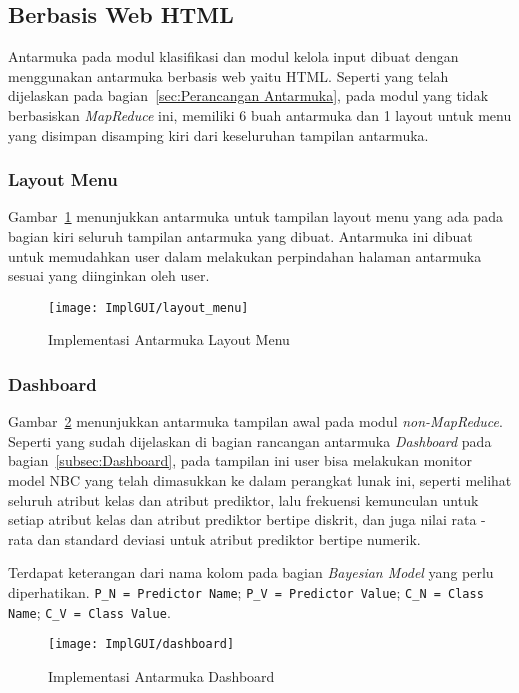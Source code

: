 \subsection{Berbasis Web HTML}
Antarmuka pada modul klasifikasi dan modul kelola input dibuat dengan menggunakan antarmuka berbasis web yaitu HTML. Seperti yang telah dijelaskan pada bagian~\ref{sec:Perancangan Antarmuka}, pada modul yang tidak berbasiskan \textit{MapReduce} ini, memiliki 6 buah antarmuka dan 1 layout untuk menu yang disimpan disamping kiri dari keseluruhan tampilan antarmuka.

\subsubsection{Layout Menu}
Gambar~\ref{fig:Implementasi Antarmuka Layout Menu} menunjukkan antarmuka untuk tampilan layout menu yang ada pada bagian kiri seluruh tampilan antarmuka yang dibuat. Antarmuka ini dibuat untuk memudahkan user dalam melakukan perpindahan halaman antarmuka sesuai yang diinginkan oleh user.
\begin{figure}[H]
	\centering
	\texttt{[image: ImplGUI/layout\_menu]}
	\caption[Implementasi Antarmuka Layout Menu]{Implementasi Antarmuka Layout Menu}
	\label{fig:Implementasi Antarmuka Layout Menu}
\end{figure}


\subsubsection{Dashboard}
Gambar~\ref{fig:Implementasi Antarmuka Dashboard} menunjukkan antarmuka tampilan awal pada modul \textit{non-MapReduce}. Seperti yang sudah dijelaskan di bagian rancangan antarmuka \textit{Dashboard} pada bagian~\ref{subsec:Dashboard}, pada tampilan ini user bisa melakukan monitor model NBC yang telah dimasukkan ke dalam perangkat lunak ini, seperti melihat seluruh atribut kelas dan atribut prediktor, lalu frekuensi kemunculan untuk setiap atribut kelas dan atribut prediktor bertipe diskrit, dan juga nilai rata - rata dan standard deviasi untuk atribut prediktor bertipe numerik. 

Terdapat keterangan dari nama kolom pada bagian \textit{Bayesian Model} yang perlu diperhatikan. \verb|P_N = Predictor Name|; \verb|P_V = Predictor Value|; \verb|C_N = Class Name|; \verb|C_V = Class Value|.

\begin{figure}[H]
	\centering
	\texttt{[image: ImplGUI/dashboard]}
	\caption[Implementasi Antarmuka Dashboard]{Implementasi Antarmuka Dashboard}
	\label{fig:Implementasi Antarmuka Dashboard}
\end{figure}


